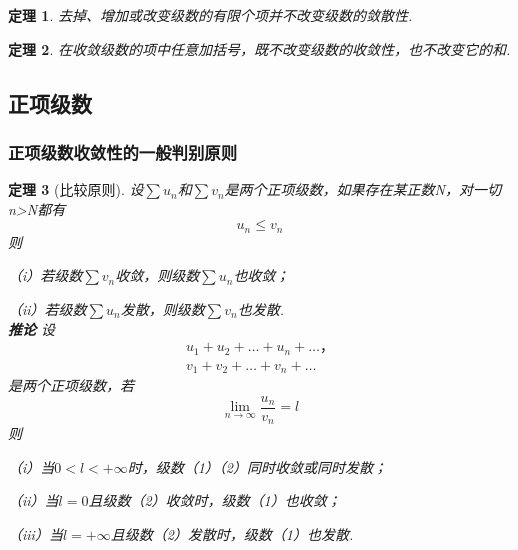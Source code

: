 \documentclass[12pt, UTF8, AutoFakeBold]{ctexart} %
\newtheorem{theorem}{定理}[section]
\begin{document}
\begin{theorem}
    去掉、增加或改变级数的有限个项并不改变级数的敛散性.
\end{theorem}

\begin{theorem}
    在收敛级数的项中任意加括号，既不改变级数的收敛性，也不改变它的和.
\end{theorem}

\subsection{正项级数}
\subsubsection{正项级数收敛性的一般判别原则}
\begin{theorem}[比较原则]
    设$\sum u_n$和$\sum v_n$是两个正项级数，如果存在某正数N，对一切n>N都有
    \[
        u_n \leq v_n
    \]
    则

    （i）若级数$\sum v_n$收敛，则级数$\sum u_n$也收敛；

    （ii）若级数$\sum u_n$发散，则级数$\sum v_n$也发散.\\
    \textbf{推论} 设
    \begin{gather}
        u_1 + u_2 + \dots + u_n + \dots，\\
        v_1 + v_2 + \dots + v_n + \dots
    \end{gather}
    是两个正项级数，若
    \[
        \lim_{n \to \infty}\frac{u_n}{v_n} = l
    \]
    则

    （i）当$0<l<+\infty$时，级数（1）（2）同时收敛或同时发散；

    （ii）当$l=0$且级数（2）收敛时，级数（1）也收敛；

    （iii）当$l=+\infty$且级数（2）发散时，级数（1）也发散.
\end{theorem}
\end{document}
